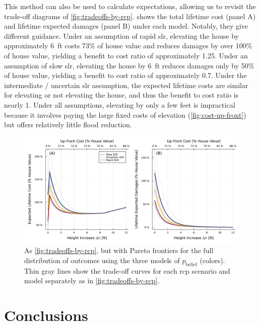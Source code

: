 \documentclass[11pt]{article}
\begin{document}
This method can also be used to calculate expectations, allowing us to revisit the trade-off diagrams of \cref{fig:tradeoffs-by-rcp}.
 shows the total lifetime cost (panel A) and lifetime expected damages (panel B) under each model.
Notably, they give different guidance.
Under an assumption of rapid \gls{slr}, elevating the house by approximately \SI{6}{ft} costs 73\% of house value and reduces damages by over 100\% of house value, yielding a benefit to cost ratio of approximately 1.25.
Under an assumption of slow \gls{slr}, elevating the house by \SI{6}{ft} reduces damages only by 50\% of house value, yielding a benefit to cost ratio of approximately 0.7.
Under the intermediate / uncertain \gls{slr} assumption, the expected lifetime costs are similar for elevating or not elevating the house, and thus the benefit to cost ratio is nearly 1.
Under all assumptions, elevating by only a few feet is impractical because it involves paying the large fixed costs of elevation (\cref{fig:cost-up-front}) but offers relatively little flood reduction.

\begin{figure}
    \centering
    \includegraphics[width=\textwidth]{tradeoffs-by-prior}
    \caption{
        As \cref{fig:tradeoffs-by-rcp}, but with Pareto frontiers for the full distribution of outcomes using the three models of $p_\mathrm{belief}$ (colors).
        Thin gray lines show the trade-off curves for each \gls{rcp} scenario and model separately as in \cref{fig:tradeoffs-by-rcp}.
    }\label{fig:tradeoffs-by-prior}
\end{figure}

\section{Conclusions}\label{sec:conclusions}
\end{document}
